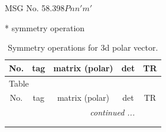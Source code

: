 \documentclass[fleqn,8pt]{jsarticle}
\begin{document}
\setcounter{MaxMatrixCols}{32}

\renewcommand{\tablename}{Table~}
\renewcommand{\figurename}{Figure~}
\begin{center}
\LARGE
MSG No. 58.398\quad$Pnn'm'$
\end{center}
* symmetry operation
\renewcommand{\arraystretch}{1.3}
\begin{longtable}{ccccc}
\caption{Symmetry operations for 3d polar vector.}
 \\
 \hline \hline
No. & tag & matrix (polar) & det & TR \\ \hline \endfirsthead

\multicolumn{4}{l}{\tablename\ \thetable{}} \\
 \hline \hline
No. & tag & matrix (polar) & det & TR \\ \hline \endhead

 \hline \hline
\multicolumn{4}{r}{\footnotesize\it continued ...} \\ \endfoot

 \hline \hline
\multicolumn{4}{r}{} \\ \endlastfoot


\end{longtable}
\end{document}
